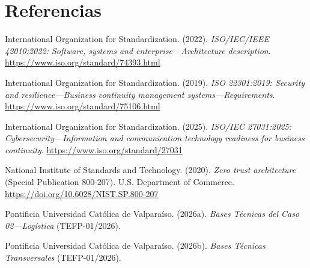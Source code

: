 \section*{Referencias}

International Organization for Standardization. (2022). \textit{ISO/IEC/IEEE 42010:2022: Software, systems and enterprise---Architecture description}. \url{https://www.iso.org/standard/74393.html}

{\raggedright International Organization for Standardization. (2019). \textit{ISO 22301:2019: Security and resilience---Business continuity management systems---Requirements}. \url{https://www.iso.org/standard/75106.html}\par}

{\raggedright International Organization for Standardization. (2025). \textit{ISO/IEC 27031:2025: Cybersecurity---Information and communication technology readiness for business continuity}. \url{https://www.iso.org/standard/27031}\par}

National Institute of Standards and Technology. (2020). \textit{Zero trust architecture} (Special Publication 800-207). U.S. Department of Commerce. \url{https://doi.org/10.6028/NIST.SP.800-207}

Pontificia Universidad Católica de Valparaíso. (2026a). \textit{Bases Técnicas del Caso 02---Logística} (TEFP-01/2026).

Pontificia Universidad Católica de Valparaíso. (2026b). \textit{Bases Técnicas Transversales} (TEFP-01/2026).

\clearpage
